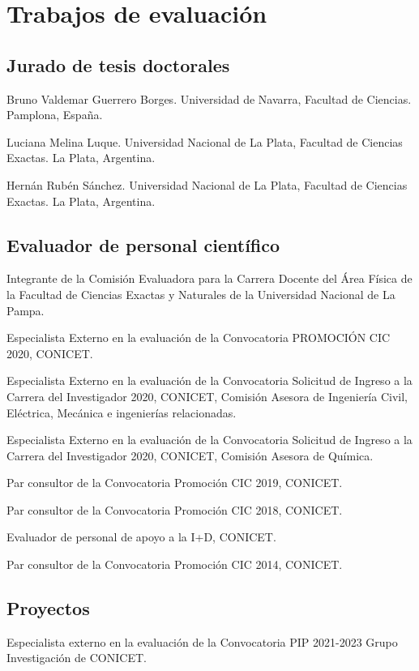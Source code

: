 \section{Trabajos de evaluación}

\subsection{Jurado de tesis doctorales}
 Bruno Valdemar Guerrero Borges. Universidad de Navarra, Facultad de Ciencias. Pamplona, España.

 Luciana Melina Luque. Universidad Nacional de La Plata, Facultad de Ciencias Exactas. La Plata, Argentina.

 Hernán Rubén Sánchez. Universidad Nacional de La Plata, Facultad de Ciencias Exactas. La Plata, Argentina.



\subsection{Evaluador de personal científico}

 Integrante de la Comisión Evaluadora para la Carrera Docente del Área Física de la Facultad de Ciencias Exactas y Naturales de la Universidad Nacional de La Pampa.

Especialista Externo en la evaluación de la Convocatoria PROMOCIÓN CIC 2020, CONICET.

 Especialista Externo en la evaluación de la Convocatoria Solicitud de Ingreso a la Carrera del Investigador 2020, CONICET,
 Comisión Asesora de Ingeniería Civil, Eléctrica, Mecánica e ingenierías relacionadas.

Especialista Externo en la evaluación de la Convocatoria Solicitud de Ingreso a la Carrera del Investigador 2020, CONICET, 
Comisión Asesora de Química.

 Par consultor de la Convocatoria Promoción CIC 2019, CONICET.

 Par consultor de la Convocatoria Promoción CIC 2018, CONICET.

 Evaluador de personal de apoyo a la I+D, CONICET.

 Par consultor de la Convocatoria Promoción CIC 2014, CONICET.

\subsection{Proyectos}
 Especialista externo en la evaluación de la Convocatoria PIP 2021-2023 Grupo Investigación de CONICET.

